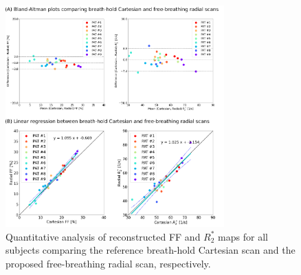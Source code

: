 \documentclass[journal,twoside,web]{ieeecolor}
\begin{document}
\begin{figure}
	\centering
	\includegraphics[width=0.75\textwidth]{../../figures/tan7.pdf}
	\caption{Quantitative analysis of reconstructed FF and $R_2^*$ maps 
		for all subjects comparing the reference breath-hold Cartesian scan 
		and the proposed free-breathing radial scan, respectively.}
	\label{FIG:LINREG}
\end{figure}
\end{document}
